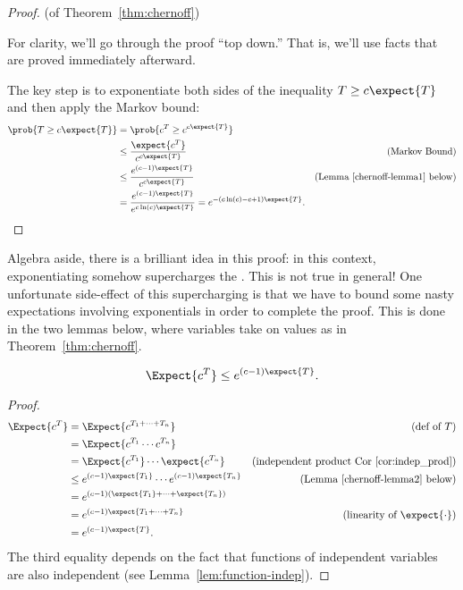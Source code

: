 \begin{proof} (of Theorem~\ref{thm:chernoff})

For clarity, we'll go through the proof ``top down.''  That is, we'll
use facts that are proved immediately afterward.

The key step is to exponentiate both sides of the inequality $T \ge c
\expect{T}$ and then apply the Markov bound:
\begingroup
\openup\jot
\begin{align*}
\prob{T \geq c \expect{T}} & = \prob{c^T \geq c^{c \expect{T}}} \\
  & \leq \frac{\expect{c^T}}{c^{c \expect{T}}} & \text{(Markov Bound)}\\
  & \leq \frac{e^{(c-1) \expect{T}}}{c^{c \expect{T}}}
         & \text{(Lemma~\ref{chernoff-lemma1} below)}\\
  & = \frac{e^{(c-1) \expect{T}}}{e^{c \ln(c) \expect{T}}} = e^{- (c \ln(c) - c + 1) \expect{T}}.
\end{align*}
\endgroup
\end{proof}

Algebra aside, there is a brilliant idea in this proof: in this
context, exponentiating somehow supercharges the .
This is not true in general!  One unfortunate side-effect of this
supercharging is that we have to bound some nasty expectations
involving exponentials in order to complete the proof.  This is done
in the two lemmas below, where variables take on values as in
Theorem~\ref{thm:chernoff}.

\begin{lemma}\label{chernoff-lemma1}
\[
    \Expect{c^T} \leq e^{(c-1) \expect{T}}.
\]
\end{lemma}

\begin{proof}
\begin{align*}
    \Expect{c^T} & = \Expect{c^{T_1 + \cdots + T_n}}
                 & \text{(def of $T$)}\\
            & = \Expect{c^{T_1} \cdots c^{T_n}} \\
            & = \Expect{c^{T_1}}  \cdots \expect{c^{T_n}}
                 & \text{(independent product Cor~\ref{cor:indep_prod})}\\
            & \leq e^{(c-1) \expect{T_1}} \cdots  e^{(c-1) \expect{T_n}}
               & \text{(Lemma~\ref{chernoff-lemma2} below)}\\
            & = e^{(c-1) (\expect{T_1} + \cdots + \expect{T_n})} \\
            & = e^{(c-1) \expect{T_1 + \cdots + T_n}}
                   & \text{(linearity of $\expect{\cdot}$)}\\
            & = e^{(c-1) \expect{T}}.
\end{align*}
The third equality depends on the fact that functions of independent
variables are also independent (see Lemma~\ref{lem:function-indep}).
\end{proof}

